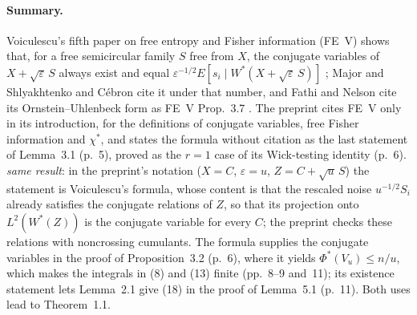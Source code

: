 \documentclass[11pt]{article}
\newcommand{\ploc}[2]{#1}
\newcommand{\sloc}[2]{\cite[#2]{#1}}
\newcommand{\rel}[1]{\textit{#1}}
\begin{document}
\paragraph{Summary.}
Voiculescu's fifth paper on free entropy and Fisher information (FE~V) shows
that, for a free semicircular family $S$ free from $X$, the conjugate
variables of $X+\sqrt\varepsilon\,S$ always exist and equal
$\varepsilon^{-1/2}E[s_i\mid W^*(X+\sqrt\varepsilon\,S)]$
\sloc{NL-Voiculescu1998}{Cor.~3.9}; Major and Shlyakhtenko
\sloc{MajorShlyakhtenko2025-StrongOneBoundedNonMicrostates}{\S2.1, p.~4} and
C\'ebron \sloc{Cebron2018-QuantitativeFourthMomentFree}{p.~6} cite it under
that number, and Fathi and Nelson cite its Ornstein--Uhlenbeck form as FE~V
Prop.~3.7 \sloc{FathiNelson2016-FreeSteinKernelsFreeLSI}{p.~7}. The preprint
cites FE~V only in its introduction, for the definitions of conjugate
variables, free Fisher information and $\chi^*$, and states the formula
without citation as the last statement of
\ploc{Lemma~3.1 (p.~5)}{03-fisher.tex:45--48}, proved as the $r=1$ case of
its Wick-testing identity \ploc{(p.~6)}{03-fisher.tex:95--97}.
\rel{same result}: in the preprint's notation ($X=C$, $\varepsilon=u$,
$Z=C+\sqrt u\,S$) the statement is Voiculescu's formula, whose content is that
the rescaled noise $u^{-1/2}S_i$ already satisfies the conjugate relations of
$Z$, so that its projection onto $L^2(W^*(Z))$ is the conjugate variable for
every $C$; the preprint checks these relations with noncrossing cumulants.
The formula supplies the conjugate variables in the proof of
\ploc{Proposition~3.2 (p.~6)}{03-fisher.tex:117--118}, where it yields
$\Phi^*(V_u)\le n/u$, which makes the integrals in
\ploc{(8)}{04-signal.tex:86--97} and \ploc{(13)}{05-flow.tex:16--19} finite
\ploc{(pp.~8--9 and~11)}{04-signal.tex:90--97, 05-flow.tex:126--127}; its
existence statement lets Lemma~2.1 give \ploc{(18)}{05-flow.tex:110--114} in
the proof of \ploc{Lemma~5.1 (p.~11)}{05-flow.tex:104--114}. Both uses lead to
Theorem~1.1.
\end{document}
